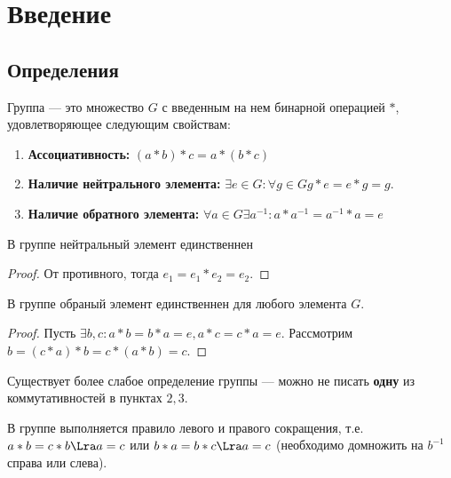
\section{Введение}
\subsection{Определения}
\begin{definition}
    Группа --- это множество \(G\) с введенным на нем бинарной операцией \(*\), удовлетворяющее следующим свойствам:
    \begin{enumerate}
        \item \textbf{Ассоциативность:} \((a * b) * c = a * (b * c)\)
        \item \textbf{Наличие нейтрального элемента:} \(\exists e \in G: \forall g \in G g * e = e * g = g\).
        \item \textbf{Наличие обратного элемента:} \(\forall a \in G \exists a^{-1}: a * a^{-1} = a^{-1} * a = e\)
    \end{enumerate}
\end{definition}

\begin{note}
    В группе нейтральный элемент единственнен
\end{note}
\begin{proof}
    От противного, тогда \(e_1 = e_1 * e_2 = e_2\).
\end{proof}

\begin{note}
    В группе обраный элемент единственнен для любого элемента \(G\).
\end{note}
\begin{proof}
    Пусть \(\exists b, c: a * b = b * a = e, a * c = c * a = e\). Рассмотрим \(b = (c * a) * b = c * (a * b) = c\).
\end{proof}

\begin{note}
    Существует более слабое определение группы --- можно не писать \textbf{одну} из коммутативностей в пунктах \(2, 3\).
\end{note}

\begin{proposition}
    В группе выполняется правило левого и правого сокращения, т.е. \(a * b = c * b \Lra a = c\) или \(b * a = b * c \Lra a = c\) (необходимо домножить на \(b^{-1}\) справа или слева).
\end{proposition}

